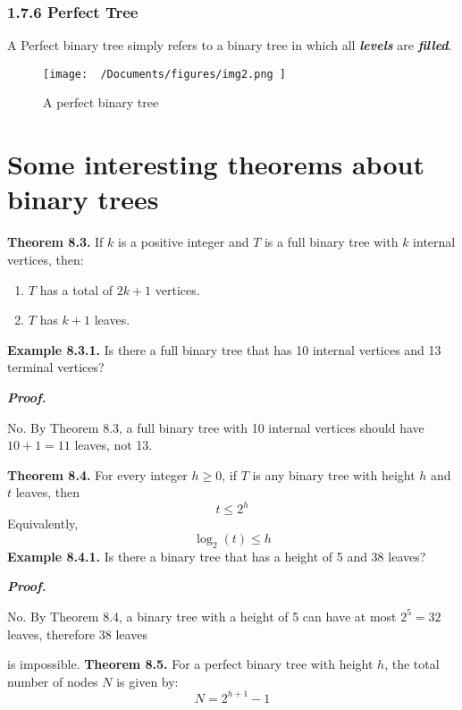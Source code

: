 \documentclass{report}
\begin{document}
\subsubsection{1.7.6 Perfect Tree}
A Perfect binary tree simply refers to a binary tree in which all \textit{\textbf{levels}} are \textit{\textbf{filled}}.
\begin{figure}[ht]
\centering
\texttt{[image:  ~/Documents/figures/img2.png ]}
\caption{A perfect binary tree}
\end{figure}
\section*{Some interesting theorems about binary trees}

\textbf{Theorem 8.3.} If \( k \) is a positive integer and \( T \) is a full binary tree with \( k \) internal vertices, then:
\begin{enumerate}
    \item \( T \) has a total of \( 2k+1 \) vertices.
    \item \( T \) has \( k+1 \) leaves.
\end{enumerate}
\bigbreak \noindent
\noindent \textbf{Example 8.3.1.} Is there a full binary tree that has 10 internal vertices and 13 terminal vertices? \vspace{2mm}

\noindent \textbf{\textit{Proof.}} \vspace{2mm}

 No. By Theorem 8.3, a full binary tree with 10 internal vertices should have \( 10 + 1 = 11 \) leaves, not 13.

\bigbreak \noindent \bigbreak \noindent
\textbf{Theorem 8.4.} For every integer \( h \geq 0 \), if \( T \) is any binary tree with height \( h \) and \( t \) leaves, then
\[
t \leq 2^{h}
\]
Equivalently, 
\[
\log_2(t) \leq h
\]
\bigbreak \noindent
\textbf{Example 8.4.1.} Is there a binary tree that has a height of 5 and 38 leaves? \vspace{2mm}

\noindent \textbf{\textit{Proof.}}  \vspace{1.5mm}

No. By Theorem 8.4, a binary tree with a height of 5 can have at most \( 2^5 = 32 \) leaves, therefore 38 leaves 

is impossible.
\bigbreak \noindent \bigbreak \noindent
\textbf{Theorem 8.5.} For a perfect binary tree with height \( h \), the total number of nodes \( N \) is given by:
\[
N = 2^{h+1} - 1
\]
\end{document}
